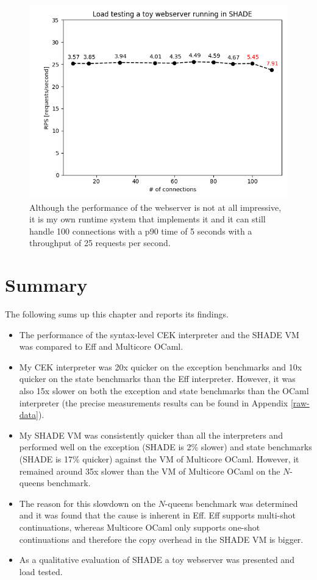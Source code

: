 \documentclass[class=article, crop=false]{standalone}
\begin{document}
\begin{figure}[htb]
    \centering
    \includegraphics[height=.3\textheight]{eval_plots/webserver.png}
    \caption[Load testing a toy webserver]{Although the performance of the webserver is not at all impressive,
    it is my own runtime system that implements it and it can still handle 100
    connections with a p90 time of 5 seconds with a throughput of 25 requests
    per second.}
    \label{fig:hello-online-world}
\end{figure}

\section{Summary}
The following sums up this chapter and reports its findings.
\begin{itemize}
\item The performance of the syntax-level CEK interpreter and the SHADE VM was
compared to Eff and Multicore OCaml.
\item My CEK interpreter was 20x quicker on the exception benchmarks and 10x
quicker on the state benchmarks than the Eff interpreter. However, it was also
15x slower on both the exception and state benchmarks than the OCaml interpreter
(the precise measurements results can be found in Appendix \autoref{raw-data}).
\item My SHADE VM was consistently quicker than all the interpreters and
performed well on the exception (SHADE is 2\% slower) and state benchmarks
(SHADE is 17\% quicker) against the VM of Multicore OCaml. However,
it remained around 35x slower than the VM of Multicore OCaml on the $N$-queens
benchmark.
\item The reason for this slowdown on the $N$-queens benchmark
was determined and it was found that the cause is inherent in Eff. Eff supports
multi-shot continuations, whereas Multicore OCaml only supports one-shot
continuations and therefore the copy overhead in the SHADE VM is bigger.
\item As a qualitative evaluation of SHADE a toy webserver was presented and
load tested.
\end{itemize}
\end{document}
